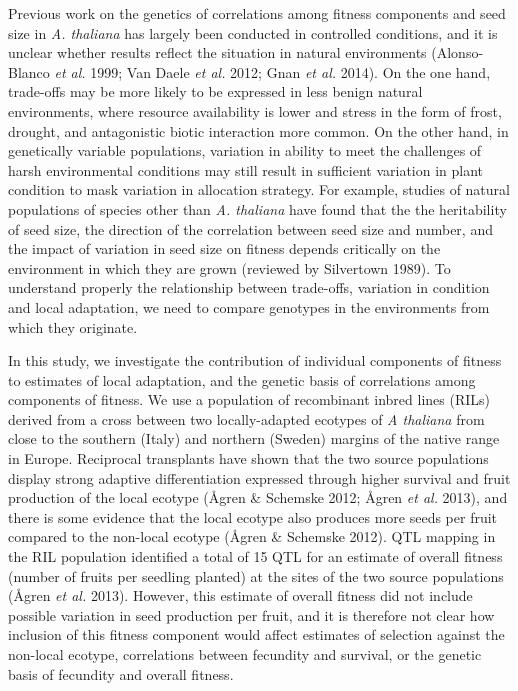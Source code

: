 \documentclass[]{article}
\begin{document}
Previous work on the genetics of correlations among fitness components and seed size in \emph{A. thaliana} has largely been conducted in controlled conditions, and it is unclear whether results reflect the situation in natural environments (Alonso-Blanco \emph{et al.} 1999; Van Daele \emph{et al.} 2012; Gnan \emph{et al.} 2014). On the one hand, trade-offs may be more likely to be expressed in less benign natural environments, where resource availability is lower and stress in the form of frost, drought, and antagonistic biotic interaction more common. On the other hand, in genetically variable populations, variation in ability to meet the challenges of harsh environmental conditions may still result in sufficient variation in plant condition to mask variation in allocation strategy. For example, studies of natural populations of species other than \emph{A. thaliana} have found that the the heritability of seed size, the direction of the correlation between seed size and number, and the impact of variation in seed size on fitness depends critically on the environment in which they are grown (reviewed by Silvertown 1989). To understand properly the relationship between trade-offs, variation in condition and local adaptation, we need to compare genotypes in the environments from which they originate.

In this study, we investigate the contribution of individual components of fitness to estimates of local adaptation, and the genetic basis of correlations among components of fitness. We use a population of recombinant inbred lines (RILs) derived from a cross between two locally-adapted ecotypes of \emph{A thaliana} from close to the southern (Italy) and northern (Sweden) margins of the native range in Europe. Reciprocal transplants have shown that the two source populations display strong adaptive differentiation expressed through higher survival and fruit production of the local ecotype (Ågren \& Schemske 2012; Ågren \emph{et al.} 2013), and there is some evidence that the local ecotype also produces more seeds per fruit compared to the non-local ecotype (Ågren \& Schemske 2012). QTL mapping in the RIL population identified a total of 15 QTL for an estimate of overall fitness (number of fruits per seedling planted) at the sites of the two source populations (Ågren \emph{et al.} 2013). However, this estimate of overall fitness did not include possible variation in seed production per fruit, and it is therefore not clear how inclusion of this fitness component would affect estimates of selection against the non-local ecotype, correlations between fecundity and survival, or the genetic basis of fecundity and overall fitness.
\end{document}
